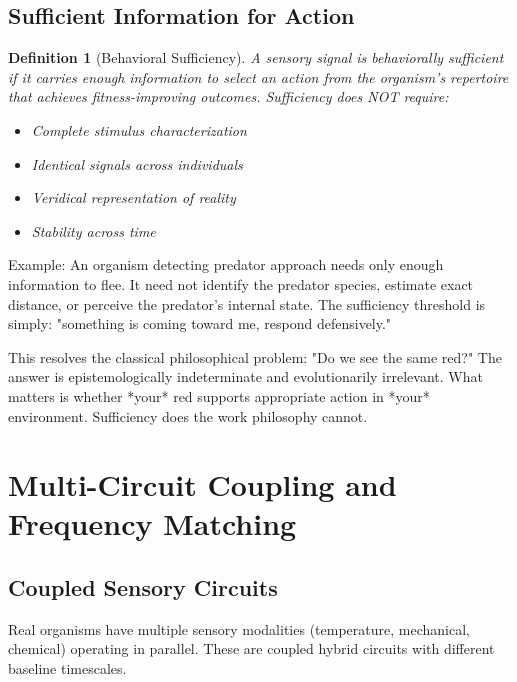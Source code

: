 \documentclass[twocolumn,10pt]{article}
\newtheorem{definition}[theorem]{Definition}
\theoremstyle{remark}
\begin{document}
\subsection{Sufficient Information for Action}

\begin{definition}[Behavioral Sufficiency]
\label{def:sufficient}
A sensory signal is behaviorally sufficient if it carries enough information to select an action from the organism's repertoire that achieves fitness-improving outcomes. Sufficiency does NOT require:
\begin{itemize}
  \item Complete stimulus characterization
  \item Identical signals across individuals
  \item Veridical representation of reality
  \item Stability across time
\end{itemize}
\end{definition}

Example: An organism detecting predator approach needs only enough information to flee. It need not identify the predator species, estimate exact distance, or perceive the predator's internal state. The sufficiency threshold is simply: "something is coming toward me, respond defensively."

This resolves the classical philosophical problem: "Do we see the same red?" The answer is epistemologically indeterminate and evolutionarily irrelevant. What matters is whether *your* red supports appropriate action in *your* environment. Sufficiency does the work philosophy cannot.

\section{Multi-Circuit Coupling and Frequency Matching}
\label{sec:multimodal}

\subsection{Coupled Sensory Circuits}

Real organisms have multiple sensory modalities (temperature, mechanical, chemical) operating in parallel. These are coupled hybrid circuits with different baseline timescales.
\end{document}
